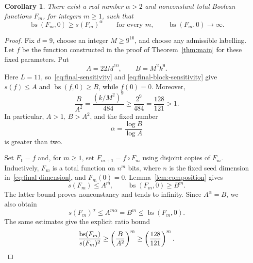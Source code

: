 \documentclass[11pt]{article}
\newcommand{\bs}{\operatorname{bs}}
\newtheorem{corollary}[theorem]{Corollary}
\theoremstyle{definition}
\theoremstyle{remark}
\begin{document}
\begin{corollary}
\label{cor:power-separation}
There exist a real number $\alpha>2$ and nonconstant total Boolean
functions $F_m$, for integers $m\geq1$, such that
\[
 \bs(F_m,0)\geq s(F_m)^\alpha
 \qquad\text{for every }m,
 \qquad
 \bs(F_m,0)\longrightarrow\infty.
\]
\end{corollary}

\begin{proof}
Fix $d=9$, choose an integer $M\geq9^{10}$, and choose any admissible
labelling. Let $f$ be the function constructed in the proof of
Theorem~\ref{thm:main} for these fixed parameters. Put
\[
 A=22M^{10},\qquad B=M^2k^9.
\]
Here $L=11$, so~\eqref{eq:final-sensitivity} and
\eqref{eq:final-block-sensitivity} give
$s(f)\leq A$ and $\bs(f,0)\geq B$, while $f(0)=0$.
Moreover,
\[
 \frac{B}{A^2}
   =\frac{(k/M^2)^9}{484}
   \geq\frac{2^9}{484}
   =\frac{128}{121}>1.
\]
In particular, $A>1$, $B>A^2$, and the fixed number
\[
 \alpha=\frac{\log B}{\log A}
\]
is greater than two.

Set $F_1=f$ and, for $m\geq1$, set $F_{m+1}=f\circ F_m$ using disjoint
copies of $F_m$. Inductively, $F_m$ is a total function on $n^m$ bits,
where $n$ is the fixed seed dimension in~\eqref{eq:final-dimension},
and $F_m(0)=0$.
Lemma~\ref{lem:composition} gives
\[
 s(F_m)\leq A^m,
 \qquad
 \bs(F_m,0)\geq B^m.
\]
The latter bound proves nonconstancy and tends to infinity. Since
$A^\alpha=B$, we also obtain
\[
 s(F_m)^\alpha\leq A^{m\alpha}=B^m\leq\bs(F_m,0).
\]
The same estimates give the explicit ratio bound
\[
 \frac{\bs(F_m)}{s(F_m)^2}
 \geq\left(\frac{B}{A^2}\right)^m
 \geq\left(\frac{128}{121}\right)^m.\qedhere
\]
\end{proof}



\end{document}
